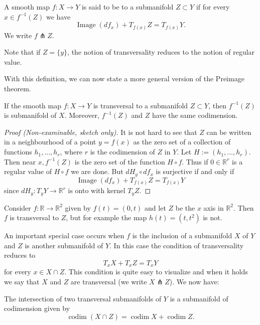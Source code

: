 \documentclass[a4paper]{scrartcl}
\begin{document}
\begin{definition}[Transversal]
    A smooth map $f: X \rightarrow Y$ is said to be  to a submanifold $Z \subset Y$ if for every $x \in f^{-1}(Z)$ we have
$$
\operatorname{Image}\left(d f_{x}\right)+T_{f(x)} Z=T_{f(x)} Y.
$$
We write $f \pitchfork Z$.
\end{definition}

Note that if $Z=\{y\}$, the notion of transversality reduces to the notion of regular value.

With this definition, we can now state a more general version of the Preimage theorem.

\begin{theorem}
    If the smooth map $f: X \rightarrow Y$ is transversal to a submanifold $Z \subset Y$, then $f^{-1}(Z)$ is submanifold of $X$. Moreover, $f^{-1}(Z)$ and $Z$ have the same codimension.
\end{theorem}
\begin{proof}[Proof (Non-examinable, sketch only)]
    It is not hard to see that $Z$ can be written in a neighbourhood of a point $y=f(x)$ as the zero set of a collection of functions $h_{1}, \ldots, h_{r}$, where $r$ is the codimension of $Z$ in $Y$. Let $H:=\left(h_{1}, \ldots, h_{r}\right)$. Then near $x, f^{-1}(Z)$ is the zero set of the function $H \circ f$. Thus if $0 \in \mathbb{R}^{r}$ is a regular value of $H \circ f$ we are done. But $d H_{y} \circ d f_{x}$ is surjective if and only if
    $$
    \operatorname{Image}\left(d f_{x}\right)+T_{f(x)} Z=T_{f(x)} Y
    $$
    since $d H_{y}: T_{y} Y \rightarrow \mathbb{R}^{r}$ is onto with kernel $T_{y} Z$.
\end{proof}

\begin{example}
    Consider $f: \mathbb{R} \rightarrow \mathbb{R}^{2}$ given by $f(t)=(0, t)$ and let $Z$ be the $x$ axis in $\mathbb{R}^{2}$. Then $f$ is transversal to $Z$, but for example the map $h(t)=\left(t, t^{2}\right)$ is not.
\end{example}

An important special case occurs when $f$ is the inclusion of a submanifold $X$ of $Y$ and $Z$ is another submanifold of $Y$. In this case the condition of transversality reduces to
$$
T_{x} X+T_{x} Z=T_{x} Y
$$
for every $x \in X \cap Z$. This condition is quite easy to visualize and when it holds we say that $X$ and $Z$ are transversal (we write $X \pitchfork Z$). We now have:

\begin{theorem}
    The intersection of two transversal submanifolds of $Y$ is a submanifold of codimension given by
$$
\operatorname{codim}(X \cap Z)=\operatorname{codim} X+\operatorname{codim} Z.
$$
\end{theorem}
\end{document}
